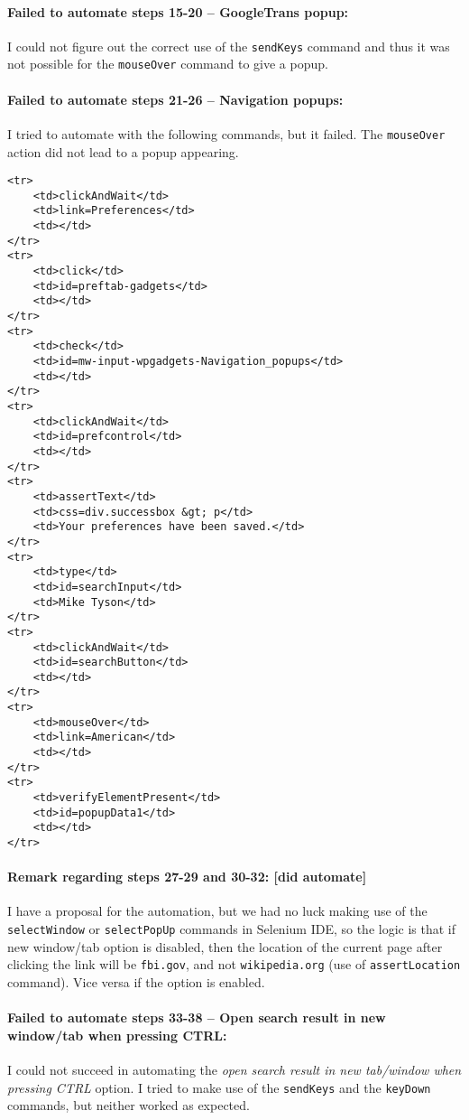 \documentclass[a4paper,10pt]{article}
\begin{document}
\paragraph*{Failed to automate steps 15-20 -- GoogleTrans popup:} I could not figure out the correct use of the \texttt{sendKeys} command and thus it was not 
possible for the \texttt{mouseOver} command to give a popup. 

\paragraph*{Failed to automate steps 21-26 -- Navigation popups:} I tried to automate with the following commands, but it failed. The \texttt{mouseOver} action did not lead to a 
popup appearing.

\begin{verbatim}
<tr>
	<td>clickAndWait</td>
	<td>link=Preferences</td>
	<td></td>
</tr>
<tr>
	<td>click</td>
	<td>id=preftab-gadgets</td>
	<td></td>
</tr>
<tr>
	<td>check</td>
	<td>id=mw-input-wpgadgets-Navigation_popups</td>
	<td></td>
</tr>
<tr>
	<td>clickAndWait</td>
	<td>id=prefcontrol</td>
	<td></td>
</tr>
<tr>
	<td>assertText</td>
	<td>css=div.successbox &gt; p</td>
	<td>Your preferences have been saved.</td>
</tr>
<tr>
	<td>type</td>
	<td>id=searchInput</td>
	<td>Mike Tyson</td>
</tr>
<tr>
	<td>clickAndWait</td>
	<td>id=searchButton</td>
	<td></td>
</tr>
<tr>
	<td>mouseOver</td>
	<td>link=American</td>
	<td></td>
</tr>
<tr>
	<td>verifyElementPresent</td>
	<td>id=popupData1</td>
	<td></td>
</tr>
\end{verbatim}


\paragraph{Remark regarding steps 27-29 and 30-32: [did automate]} I have a proposal for the automation, but we had no luck making use of the \texttt{selectWindow} or \texttt{selectPopUp} 
commands in Selenium IDE, so the logic is that if new window/tab option is disabled, then the location of the current page after clicking the link will be
\texttt{fbi.gov}, and not \texttt{wikipedia.org} (use of \texttt{assertLocation} command). Vice versa if the option is enabled.

\paragraph{Failed to automate steps 33-38 -- Open search result in new window/tab when pressing CTRL:} I could not succeed in automating the \textit{open search result in new tab/window when pressing CTRL} option. I tried to 
make use of the \texttt{sendKeys} and the \texttt{keyDown} commands, but neither worked as expected.
\end{document}
